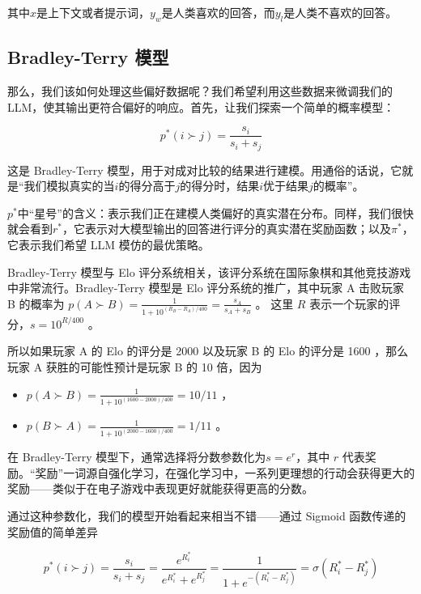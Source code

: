\documentclass[lang=cn,newtx,10pt,scheme=chinese]{elegantbook}
\begin{document}
其中$x$是上下文或者提示词，$y_w$是人类喜欢的回答，而$y_l$是人类不喜欢的回答。

\subsection{Bradley-Terry 模型}

那么，我们该如何处理这些偏好数据呢？我们希望利用这些数据来微调我们的LLM，使其输出更符合偏好的响应。首先，让我们探索一个简单的概率模型：

\begin{equation}
p^*(i \succ j) = \frac{s_i}{s_i+s_j}
\end{equation}

这是 Bradley-Terry 模型，用于对成对比较的结果进行建模。用通俗的话说，它就是``我们模拟真实的当$i$的得分高于$j$的得分时，结果$i$优于结果$j$的概率''。

\begin{marker}
$p^*$中``星号''的含义：表示我们正在建模人类偏好的真实潜在分布。同样，我们很快就会看到$r^*$，它表示对大模型输出的回答进行评分的真实潜在奖励函数；以及$\pi^*$，它表示我们希望 LLM 模仿的最优策略。
\end{marker}

Bradley-Terry 模型与 Elo 评分系统相关，该评分系统在国际象棋和其他竞技游戏中非常流行。Bradley-Terry 模型是 Elo 评分系统的推广，其中玩家 A 击败玩家 B 的概率为 $p(A\succ B) = \frac{1}{1+10^{(R_B-R_A)/400}}=\frac{s_A}{s_A+s_B}$ 。 这里 $R$ 表示一个玩家的评分，$s=10^{R/400}$ 。

\begin{marker}
所以如果玩家 A 的 Elo 的评分是 2000 以及玩家 B 的 Elo 的评分是 1600 ，那么玩家 A 获胜的可能性预计是玩家 B 的 10 倍，因为
\begin{itemize}
\item $p(A\succ B) = \frac{1}{1+10^{(1600-2000)/400}}=10/11$ ，
\item $p(B\succ A)=\frac{1}{1+10^{(2000-1600)/400}}=1/11$ 。
\end{itemize}
\end{marker}

在 Bradley-Terry 模型下，通常选择将分数参数化为$s=e^r$，其中 $r$ 代表奖励。``奖励''一词源自强化学习，在强化学习中，一系列更理想的行动会获得更大的奖励——类似于在电子游戏中表现更好就能获得更高的分数。

通过这种参数化，我们的模型开始看起来相当不错——通过 Sigmoid 函数传递的奖励值的简单差异

\begin{equation}
p^*(i\succ j)=\frac{s_i}{s_i+s_j}=\frac{e^{R_i^*}}{e^{R_i^*}+e^{R_j^*}} = \frac{1}{1+e^{-(R^*_i-R_j^*)}} = \sigma(R_i^*-R_j^*)
\end{equation}
\end{document}
